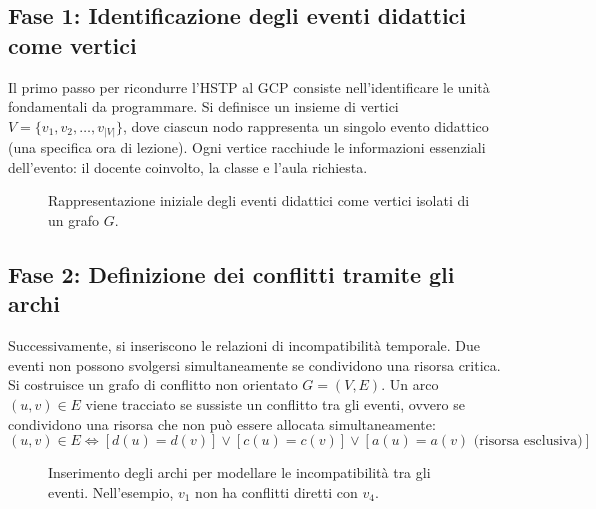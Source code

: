 \subsection*{Fase 1: Identificazione degli eventi didattici come vertici}
\label{subsec:grafo-vertici}
Il primo passo per ricondurre l'HSTP al GCP consiste nell'identificare le unità
fondamentali da programmare. Si definisce un insieme di vertici $V = \{v_1, v_2,
\dots, v_{|V|}\}$, dove ciascun nodo rappresenta un singolo evento didattico
(una specifica ora di lezione). Ogni vertice racchiude le informazioni
essenziali dell'evento: il docente coinvolto, la classe e l'aula richiesta.
\begin{figure}[htbp]
    \centering
    \caption{Rappresentazione iniziale degli eventi didattici come vertici isolati di un grafo $G$.}
    \label{fig:grafo-vertici}
\end{figure}
\newpage
\subsection*{Fase 2: Definizione dei conflitti tramite gli archi}
\label{subsec:grafo-conflitto}

Successivamente, si inseriscono le relazioni di incompatibilità temporale. Due
eventi non possono svolgersi simultaneamente se condividono una risorsa critica.
Si costruisce un grafo di conflitto non orientato $G = (V, E)$. Un arco $(u, v)
\in E$ viene tracciato se sussiste un conflitto tra gli eventi, ovvero se
condividono una risorsa che non può essere allocata simultaneamente:
\begin{equation}
(u, v) \in E \iff [d(u) = d(v)] \lor [c(u) = c(v)] \lor [a(u) = a(v) \text{ (risorsa esclusiva)}]
\end{equation}

\begin{figure}[htbp]
    \centering
    \caption{Inserimento degli archi per modellare le incompatibilità tra gli eventi. Nell'esempio, $v_1$ non ha conflitti diretti con $v_4$.}
    \label{fig:grafo-archi}
\end{figure}
\newpage

